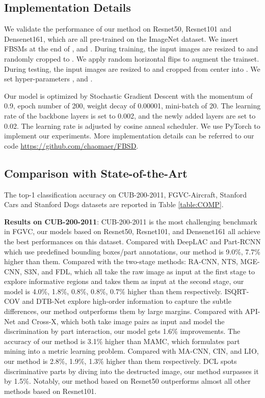 \documentclass[conference]{IEEEtran}
\begin{document}
	\subsection{Implementation Details}
	We validate the performance of our method on Resnet50, Resnet101\cite{ResNet} and Densenet161\cite{DenseNet}, which are all pre-trained on the ImageNet dataset\cite{ImageNet}. We insert FBSMs at the end of ,  and .
	During training, the input images are resized to  and randomly cropped to . We apply random horizontal flips to augment the trainset.
	During testing, the input images are
	resized to  and cropped from center into . We set hyper-parameters ,  and .
	
	Our model is optimized	by Stochastic Gradient Descent with the momentum of 0.9, epoch number of 200,
	weight decay of 0.00001, mini-batch of 20. The learning rate of the backbone layers is set to 0.002, and the newly added layers are set to 0.02. The learning rate is adjusted by cosine anneal scheduler\cite{Warm}. We use PyTorch to implement our experiments. More implementation details can be referred to our code \url{https://github.com/chaomaer/FBSD}.
	\subsection{Comparison with State-of-the-Art}
	The top-1 classification accuracy on CUB-200-2011\cite{CUB}, FGVC-Aircraft\cite{CRAFT}, Stanford Cars\cite{CAR} and Stanford Dogs\cite{DOG} datasets are reported in Table \ref{table:COMP}.
	
	\textbf{Results on CUB-200-2011}: CUB-200-2011 is the most challenging benchmark in FGVC, our models based on Resnet50, Resnet101, and Densenet161 all achieve the best performances on this dataset. Compared with DeepLAC and Part-RCNN which use predefined bounding boxes/part annotations, our method is 9.0\%, 7.7\% higher than them. Compared with the two-stage methods: RA-CNN, NTS, MGE-CNN, S3N, and FDL, which all take the raw image as input at the first stage to explore informative regions and takes them as input at the second stage, our model is 4.0\%, 1.8\%, 0.8\%, 0.8\%, 0.7\% higher than them respectively. ISQRT-COV and DTB-Net explore high-order information to capture the subtle differences, our method outperforms them by large margins. Compared with API-Net and Cross-X, which both take image pairs as input and model the discrimination by part interaction, our model gets 1.6\% improvements. The accuracy of our method is 3.1\% higher than MAMC, which formulates part mining into a metric learning problem. Compared with MA-CNN, CIN, and LIO, our method is 2.8\%, 1.9\%, 1.3\% higher than them respectively. 
	DCL spots discriminative parts by diving into the destructed image, our method surpasses it by 1.5\%. Notably, our method based on Resnet50 outperforms almost all other methods based on Resnet101.
	
\end{document}
